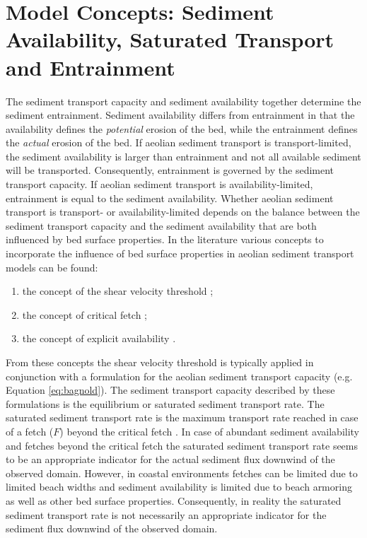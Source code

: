 \section{Model Concepts: Sediment Availability, Saturated Transport
  and Entrainment}
\label{sec:model_concepts}

The sediment transport capacity and sediment availability together
determine the sediment entrainment. Sediment availability differs from
entrainment in that the availability defines the \emph{potential}
erosion of the bed, while the entrainment defines the \emph{actual}
erosion of the bed. If aeolian sediment transport is
transport-limited, the sediment availability is larger than
entrainment and not all available sediment will be
transported. Consequently, entrainment is governed by the sediment
transport capacity. If aeolian sediment transport is
availability-limited, entrainment is equal to the sediment
availability. Whether aeolian sediment transport is transport- or
availability-limited depends on the balance between the sediment
transport capacity and the sediment availability that are both
influenced by bed surface properties. In the literature various
concepts to incorporate the influence of bed surface properties in
aeolian sediment transport models can be found: 

\begin{enumerate}
\item the concept of the shear velocity threshold
  \citep[e.g.][]{Howard1977, Dyer1986, Belly1964, Johnson1965,
    Hotta1984, Nickling1981, Arens1996};
\item the concept of critical fetch \citep[e.g.][]{Bauer2002,
    DelgadoFernandez2010};
\item the concept of explicit availability \citep[or
  supply;][]{deVries2014a}.
\end{enumerate}

From these concepts the shear velocity threshold is typically applied
in conjunction with a formulation for the aeolian sediment transport
capacity (e.g. Equation \ref{eq:bagnold}). The sediment transport
capacity described by these formulations is the equilibrium or
saturated sediment transport rate. The saturated sediment transport
rate is the maximum transport rate reached in case of a fetch ($F$)
beyond the critical fetch \citep[$F_{\mathrm{c}}$, ][]{Bauer2002}. In
case of abundant sediment availability and fetches beyond the critical
fetch the saturated sediment transport rate seems to be an appropriate
indicator for the actual sediment flux downwind of the observed
domain. However, in coastal environments fetches can be limited due to
limited beach widths \citep[e.g.][]{Jackson1999, Bauer2009,
  DavidsonArnott2005, DelgadoFernandez2010, Dong2004a} and sediment
availability is limited due to beach armoring as well as other bed
surface properties. Consequently, in reality the saturated sediment
transport rate is not necessarily an appropriate indicator for the
sediment flux downwind of the observed domain.

